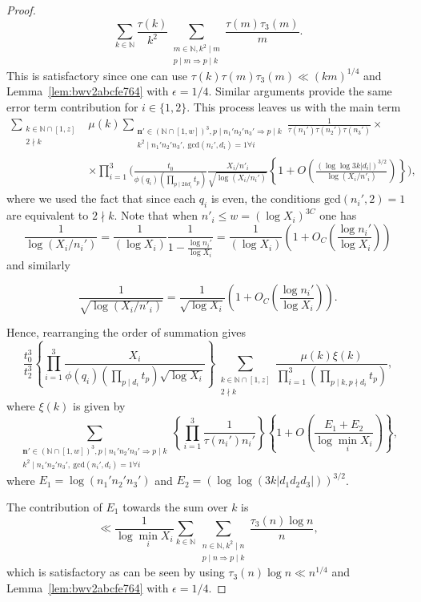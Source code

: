 \documentclass[a4paper,12pt,reqno]{amsart}
\numberwithin{equation}{section} \numberwithin{figure}{section}
\newcommand\N{\mathbb{N}}
\renewcommand{\l}{\left}
\renewcommand{\r}{\right}
\renewcommand{\b}{\mathbf}
\renewcommand{\gcd}{\textrm{gcd}}
\renewcommand{\leq}{\leqslant}
\renewcommand{\#}{\sharp}
\theoremstyle{definition}
\numberwithin{lemma}{section}
\newcommand{\beq}[2]
{
\begin{equation}
\label{#1}
{#2}
\end{equation}
}
\begin{document}
\begin{proof}
\[\sum_{k\in \N}\frac{ \tau(k ) }{k^2} \sum_{\substack{ m \in \N, k^2\mid m  \\ p\mid m \Rightarrow p\mid k    } } \frac{\tau(m)\tau_3(m) }{m}
.\] This is satisfactory since one can use $\tau(k) \tau(m)\tau_3(m) \ll (km)^{1/4}$ and Lemma~\ref{lem:bwv2abcfe764} with $\epsilon=1/4$.
Similar arguments provide the same error term contribution for $i\in \{1,2\}$. This process leaves us with  the main term 
\begin{align*}
\sum_{\substack{ k\in \N \cap [1,z] \\2\nmid k  } } 
 &\mu(k) 
\sum_{\substack{ \b n' \in (\N\cap[1,w])^3, p\mid n_1'n_2'n_3' \Rightarrow p\mid k \\
k^2\mid n_1'n_2'n_3' ,\ 
\gcd(n_i',d_i )=1 \forall i } } 
\frac{1}{\tau( n_1')\tau( n_2')\tau( n_3')} \times 
\\
&  \times 
\prod_{i=1}^3
\Bigg( 
  \frac{t_0 }{\phi(q_i)
(\prod_{p\mid 2kd_i} t_p)}
\frac{X_i/n'_i}{\sqrt{\log (X_i/n_i')} }
\l\{1+O\l(\frac{(\log \log 3 k|d_i|)^{3/2}}{\log (X_i/n'_i)}\r)\r\} 
 \Bigg),\end{align*} where we used the fact that since each  $q_i $ is even, the conditions $\gcd(n_i',2)=1$ 
are equivalent to   $2\nmid k $.
Note that  when $n'_i \leq w= (\log X_i)^{3C}$ one has 
\[
\frac{1}{\log(X_i/n_i')} =\frac{1}{(\log X_i)} \frac{1}{1-\frac{\log n_i'}{\log X_i}}
=\frac{1}{(\log X_i)} \l(1+O_C\l(\frac{\log n_i'}{\log X_i}\r) \r)
\] and similarly 
\beq
{eq:tlrsqrtlog}{
\frac{1}{\sqrt{\log (X_i/n'_i)}  }= \frac{1}{\sqrt{\log X_i}  } \l( 1+O_C\l(\frac{\log n_i ' }{\log X_i }\r)\r)  .}
Hence,  rearranging the order of summation  gives 
\[ 
\frac{t_0^3}{t_2^3}
\l\{ \prod_{i=1}^3 
\frac{X_i}{ \phi(q_i)
(\prod_{p\mid  d_i  } t_p)
\sqrt{\log X_i}
} \r\}\sum_{\substack{ k\in \N \cap [1,z]  \\2\nmid k } }  
\frac{ \mu(k) \xi(k ) }{\prod_{i=1}^3\l(\prod_{p\mid k,p\nmid d_i}t_p\r)} 
,\] where $\xi(k )  $ is given by 
\[ 
\sum_{\substack{ \b n' \in (\N\cap[1,w])^3, p\mid n_1'n_2'n_3' \Rightarrow p\mid k \\
k^2\mid n_1'n_2'n_3' ,\ 
\gcd(n_i',d_i )=1 \forall i } } 
 \l\{\prod_{i=1}^3
\frac{1 }{ \tau( n_i') n_i'}  
\r\}
 \l\{1
+O\l(\frac{ E_1   +E_2 }{\log  \min_i X_i}
\r)
 \r\} 
,\] where $E_1= \log (n_1'n_2'n_3')$ and  $E_2=(\log \log (3 k |d_1d_2d_3| ))^{3/2} $.

The contribution of $E_1$ towards the sum over $k$ is 
\[
\ll   
\frac{1}{\log  \min_i X_i}
\sum_{ k\in \N   }  \sum_{\substack{ n\in \N, k^2 \mid n \\  p\mid n \Rightarrow p\mid k  }}
\frac{\tau_3(n) \log n }{n}  
, \] which is satisfactory as can be seen by using $\tau_3(n) \log n \ll n^{1/4}$ and Lemma~\ref{lem:bwv2abcfe764} with $\epsilon=1/4$. 



\end{proof}
\end{document}
